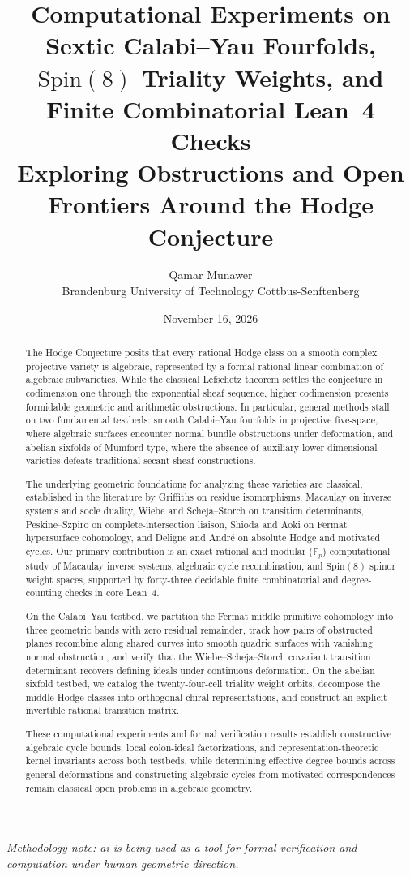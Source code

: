 \documentclass[11pt,a4paper]{article}
\title{\textbf{Computational Experiments on Sextic Calabi--Yau Fourfolds, $\mathrm{Spin}(8)$ Triality Weights, and Finite Combinatorial Lean~4 Checks}\\[0.6ex]
\large Exploring Obstructions and Open Frontiers Around the Hodge Conjecture}
\author{Qamar Munawer \\ Brandenburg University of Technology Cottbus-Senftenberg}
\date{November 16, 2026}
\theoremstyle{definition}
\theoremstyle{remark}
\begin{document}
\maketitle
\vspace{0.5em}\noindent\textit{Methodology note: ai is being used as a tool for formal verification and computation under human geometric direction.}

\begin{abstract}
The Hodge Conjecture posits that every rational Hodge class on a smooth complex projective variety is algebraic, represented by a formal rational linear combination of algebraic subvarieties. While the classical Lefschetz theorem settles the conjecture in codimension one through the exponential sheaf sequence, higher codimension presents formidable geometric and arithmetic obstructions. In particular, general methods stall on two fundamental testbeds: smooth Calabi--Yau fourfolds in projective five-space, where algebraic surfaces encounter normal bundle obstructions under deformation, and abelian sixfolds of Mumford type, where the absence of auxiliary lower-dimensional varieties defeats traditional secant-sheaf constructions.

The underlying geometric foundations for analyzing these varieties are classical, established in the literature by Griffiths on residue isomorphisms, Macaulay on inverse systems and socle duality, Wiebe and Scheja--Storch on transition determinants, Peskine--Szpiro on complete-intersection liaison, Shioda and Aoki on Fermat hypersurface cohomology, and Deligne and Andr\'e on absolute Hodge and motivated cycles. Our primary contribution is an exact rational and modular ($\mathbb{F}_p$) computational study of Macaulay inverse systems, algebraic cycle recombination, and $\mathrm{Spin}(8)$ spinor weight spaces, supported by forty-three decidable finite combinatorial and degree-counting checks in core Lean~4.

On the Calabi--Yau testbed, we partition the Fermat middle primitive cohomology into three geometric bands with zero residual remainder, track how pairs of obstructed planes recombine along shared curves into smooth quadric surfaces with vanishing normal obstruction, and verify that the Wiebe--Scheja--Storch covariant transition determinant recovers defining ideals under continuous deformation. On the abelian sixfold testbed, we catalog the twenty-four-cell triality weight orbits, decompose the middle Hodge classes into orthogonal chiral representations, and construct an explicit invertible rational transition matrix.

These computational experiments and formal verification results establish constructive algebraic cycle bounds, local colon-ideal factorizations, and representation-theoretic kernel invariants across both testbeds, while determining effective degree bounds across general deformations and constructing algebraic cycles from motivated correspondences remain classical open problems in algebraic geometry.
\end{abstract}
\end{document}
